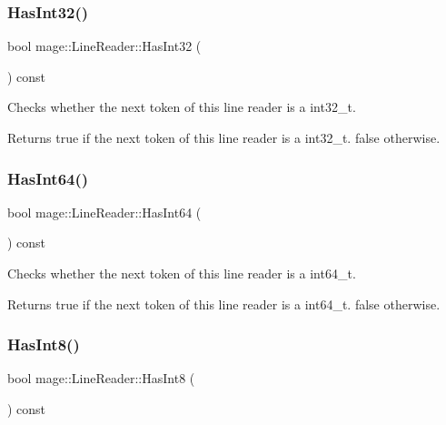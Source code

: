 \subsubsection{\texorpdfstring{Has\+Int32()}{HasInt32()}}
{\footnotesize\ttfamily bool mage\+::\+Line\+Reader\+::\+Has\+Int32 (\begin{DoxyParamCaption}{ }\end{DoxyParamCaption}) const\hspace{0.3cm}{\ttfamily [protected]}}

Checks whether the next token of this line reader is a {\ttfamily int32\+\_\+t}.

\begin{DoxyReturn}{Returns}
{\ttfamily true} if the next token of this line reader is a {\ttfamily int32\+\_\+t}. {\ttfamily false} otherwise. 
\end{DoxyReturn}
\hypertarget{classmage_1_1_line_reader_a3a7883e24fb3108a79ecda4eaac983f2}{}\label{classmage_1_1_line_reader_a3a7883e24fb3108a79ecda4eaac983f2} 
\subsubsection{\texorpdfstring{Has\+Int64()}{HasInt64()}}
{\footnotesize\ttfamily bool mage\+::\+Line\+Reader\+::\+Has\+Int64 (\begin{DoxyParamCaption}{ }\end{DoxyParamCaption}) const\hspace{0.3cm}{\ttfamily [protected]}}

Checks whether the next token of this line reader is a {\ttfamily int64\+\_\+t}.

\begin{DoxyReturn}{Returns}
{\ttfamily true} if the next token of this line reader is a {\ttfamily int64\+\_\+t}. {\ttfamily false} otherwise. 
\end{DoxyReturn}
\hypertarget{classmage_1_1_line_reader_a1eecd5324b2e212826c49e600cc46e1f}{}\label{classmage_1_1_line_reader_a1eecd5324b2e212826c49e600cc46e1f} 
\subsubsection{\texorpdfstring{Has\+Int8()}{HasInt8()}}
{\footnotesize\ttfamily bool mage\+::\+Line\+Reader\+::\+Has\+Int8 (\begin{DoxyParamCaption}{ }\end{DoxyParamCaption}) const\hspace{0.3cm}{\ttfamily [protected]}}

